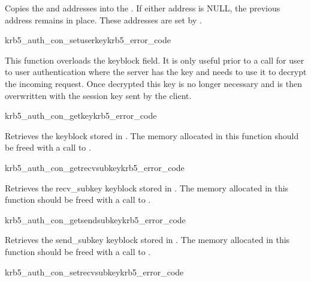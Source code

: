Copies the  and  addresses
into the . If either address is NULL, the previous
address remains in place. These addresses are set by
. 

\begin{funcdecl}{krb5_auth_con_setuserkey}{krb5_error_code}{\funcinout}
\funcin
{}
\end{funcdecl}

This function overloads the keyblock field. It is only useful prior to a
 call for user to user authentication where
the server has the key and needs to use it to decrypt the incoming
request.  Once decrypted this key is no longer necessary and is then
overwritten with the session key sent by the client. 

\begin{funcdecl}{krb5_auth_con_getkey}{krb5_error_code}{\funcinout}
\funcout
{}
\end{funcdecl}

Retrieves the keyblock stored in . The memory
allocated in this function should be freed with a call to
. 

\begin{funcdecl}{krb5_auth_con_getrecvsubkey}{krb5_error_code}{\funcinout}
\funcout
{}
\end{funcdecl}

Retrieves the recv\_subkey keyblock stored in
. The memory allocated in this function should
be freed with a call to .

\begin{funcdecl}{krb5_auth_con_getsendsubkey}{krb5_error_code}{\funcinout}
\funcout
{}
\end{funcdecl}

Retrieves the send\_subkey keyblock stored in
. The memory allocated in this function should
be freed with a call to .

\begin{funcdecl}{krb5_auth_con_setrecvsubkey}{krb5_error_code}{\funcinout}
\funcout
{}
\end{funcdecl}

